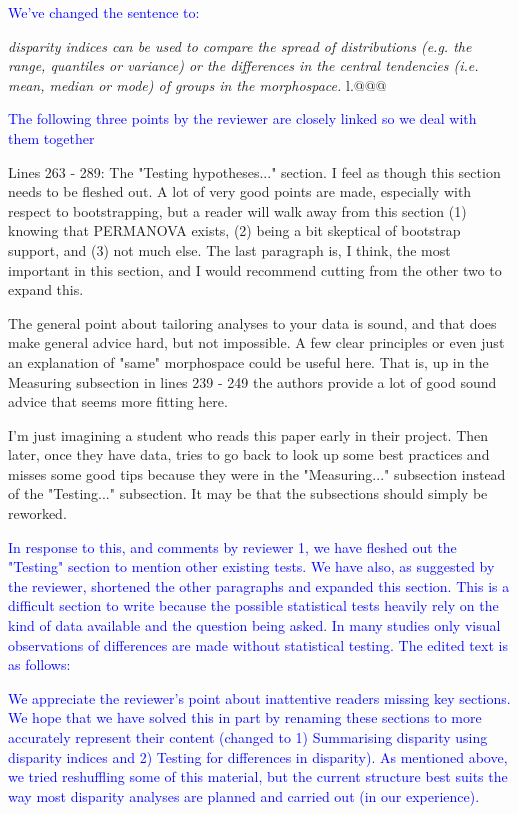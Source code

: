 \documentclass[12pt,letterpaper]{article}
\begin{document}
\textcolor{blue}{We've changed the sentence to:}

\textit{disparity indices can be used to compare the spread of distributions (e.g. the range, quantiles or variance) or the differences in the central tendencies (i.e. mean, median or mode) of groups in the morphospace.} l.@@@

\textcolor{blue}{The following three points by the reviewer are closely linked so we deal with them together}

\noindent Lines 263 - 289: The "Testing hypotheses..." section. I feel as though this section needs to be fleshed out. A lot of very good points are made, especially with respect to bootstrapping, but a reader will walk away from this section (1) knowing that PERMANOVA exists, (2) being a bit skeptical of bootstrap support, and (3) not much else. The last paragraph is, I think, the most important in this section, and I would recommend cutting from the other two to expand this.

\noindent The general point about tailoring analyses to your data is sound, and that does make general advice hard, but not impossible. A few clear principles or even just an explanation of "same" morphospace could be useful here. That is, up in the Measuring subsection in lines 239 - 249 the authors provide a lot of good sound advice that seems more fitting here. 

\noindent I'm just imagining a student who reads this paper early in their project. Then later, once they have data, tries to go back to look up some best practices and misses some good tips because they were in the "Measuring..." subsection instead of the "Testing..." subsection. It may be that the subsections should simply be reworked.

\textcolor{blue}{In response to this, and comments by reviewer 1, we have fleshed out the "Testing" section to mention other existing tests. We have also, as suggested by the reviewer, shortened the other paragraphs and expanded this section. This is a difficult section to write because the possible statistical tests heavily rely on the kind of data available and the question being asked. In many studies only visual observations of differences are made without statistical testing. The edited text is as follows:}


\textcolor{blue}{We appreciate the reviewer's point about inattentive readers missing key sections. We hope that we have solved this in part by renaming these sections to more accurately represent their content (changed to 1) Summarising disparity using disparity indices and 2) Testing for differences in disparity). As mentioned above, we tried reshuffling some of this material, but the current structure best suits the way most disparity analyses are planned and carried out (in our experience).} 
\end{document}
